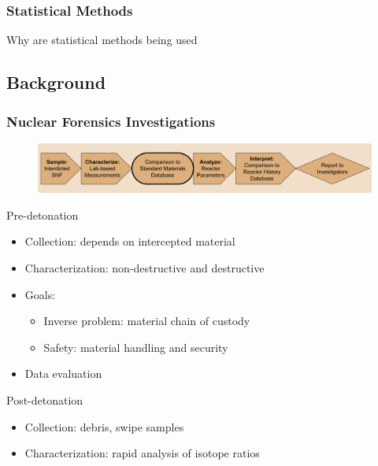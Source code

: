 \begin{frame}
  \frametitle{Statistical Methods}

  Why are statistical methods being used

\end{frame}

\subsection{Background}

\begin{frame}
  \frametitle{Nuclear Forensics Investigations}
  \begin{adjustwidth}{-10pt}{0pt}
  \begin{figure}
    \centering
    \includegraphics[width=\textwidth]{./figures/forensicsrealworld.png}
  \end{figure}
  \vspace{-3mm}
  \begin{minipage}[t]{0.5\textwidth}
    \begin{block}{Pre-detonation}
      \begin{itemize}
        \item Collection: depends on intercepted material
        \item Characterization: non-destructive and destructive
        \item Goals:
        \begin{itemize}
          \item Inverse problem: material chain of custody
          \item Safety: material handling and security
        \end{itemize}
        \item Data evaluation
      \end{itemize}
    \end{block}
  \end{minipage}%
  \hfill
  \begin{minipage}[t]{0.5\textwidth}
    \begin{block}{Post-detonation}
      \begin{itemize}
        \item Collection: debris, swipe samples
        \item Characterization: rapid analysis of isotope ratios

\end{itemize}
\end{block}
\end{minipage}
\end{adjustwidth}
\end{frame}
